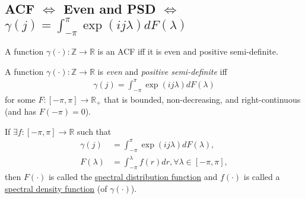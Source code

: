 \documentclass[11pt]{elegantbook}
\begin{document}
\subsection{ACF $\Leftrightarrow$ Even and PSD $\Leftrightarrow$ $\gamma(j)=\int_{-\pi}^\pi \exp\left(ij\lambda\right)d F(\lambda)$}
\begin{proposition}
    A function $\gamma(\cdot):\mathbb{Z}\rightarrow \mathbb{R}$ is an ACF iff it is even and positive semi-definite.
\end{proposition}

\begin{theorem}[Herglotz's Theorem: $\gamma(j)=\int_{-\pi}^\pi \exp\left(ij\lambda\right)d F(\lambda)$ $\Leftrightarrow$ Even and PSD]
    A function $\gamma(\cdot):\mathbb{Z}\rightarrow \mathbb{R}$ is \textit{even} and \textit{positive semi-definite} iff
    \begin{equation}
        \begin{aligned}
            \gamma(j)=\int_{-\pi}^\pi \exp\left(ij\lambda\right)d F(\lambda)
        \end{aligned}
        \nonumber
    \end{equation}
    for some $F:[-\pi, \pi] \rightarrow \mathbb{R}_+$ that is bounded, non-decreasing, and right-continuous (and has $F(-\pi)=0$).
\end{theorem}

\begin{definition}
    If $\exists f:[-\pi, \pi] \rightarrow \mathbb{R}$ such that
    \begin{equation}
        \begin{aligned}
            \gamma(j)&=\int_{-\pi}^\pi \exp\left(ij\lambda\right)d F(\lambda),\\
            F(\lambda)&=\int_{-\pi}^\lambda f(r)d r, \forall \lambda\in[-\pi, \pi],
        \end{aligned}
        \nonumber
    \end{equation}
    then $F(\cdot)$ is called the \underline{spectral distribution function} and $f(\cdot)$ is called a \underline{spectral density function} (of $\gamma(\cdot)$).
\end{definition}
\end{document}

